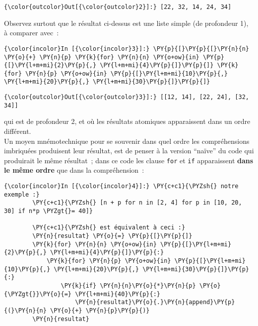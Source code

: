 \begin{Verbatim}[commandchars=\\\{\}]
{\color{outcolor}Out[{\color{outcolor}2}]:} [22, 32, 14, 24, 34]
\end{Verbatim}
            
    Observez surtout que le résultat ci-dessus est une liste simple (de
profondeur 1), à comparer avec~:

    \begin{Verbatim}[commandchars=\\\{\}]
{\color{incolor}In [{\color{incolor}3}]:} \PY{p}{[}\PY{p}{[}\PY{n}{n} \PY{o}{+} \PY{n}{p} \PY{k}{for} \PY{n}{n} \PY{o+ow}{in} \PY{p}{[}\PY{l+m+mi}{2}\PY{p}{,} \PY{l+m+mi}{4}\PY{p}{]}\PY{p}{]} \PY{k}{for} \PY{n}{p} \PY{o+ow}{in} \PY{p}{[}\PY{l+m+mi}{10}\PY{p}{,} \PY{l+m+mi}{20}\PY{p}{,} \PY{l+m+mi}{30}\PY{p}{]}\PY{p}{]}
\end{Verbatim}


\begin{Verbatim}[commandchars=\\\{\}]
{\color{outcolor}Out[{\color{outcolor}3}]:} [[12, 14], [22, 24], [32, 34]]
\end{Verbatim}
            
    qui est de profondeur 2, et où les résultats atomiques apparaissent dans
un ordre différent.\\

    Un moyen mnémotechnique pour se souvenir dans quel ordre les
compréhensions imbriquées produisent leur résultat, est de penser à la
version ``naïve'' du code qui produirait le même résultat~; dans ce code
les clause \texttt{for} et \texttt{if} apparaissent \textbf{dans le même
ordre} que dans la compréhension~:

    \begin{Verbatim}[commandchars=\\\{\}]
{\color{incolor}In [{\color{incolor}4}]:} \PY{c+c1}{\PYZsh{} notre exemple :}
        \PY{c+c1}{\PYZsh{} [n + p for n in [2, 4] for p in [10, 20, 30] if n*p \PYZgt{}= 40]}
        
        \PY{c+c1}{\PYZsh{} est équivalent à ceci :}
        \PY{n}{resultat} \PY{o}{=} \PY{p}{[}\PY{p}{]}
        \PY{k}{for} \PY{n}{n} \PY{o+ow}{in} \PY{p}{[}\PY{l+m+mi}{2}\PY{p}{,} \PY{l+m+mi}{4}\PY{p}{]}\PY{p}{:}
            \PY{k}{for} \PY{n}{p} \PY{o+ow}{in} \PY{p}{[}\PY{l+m+mi}{10}\PY{p}{,} \PY{l+m+mi}{20}\PY{p}{,} \PY{l+m+mi}{30}\PY{p}{]}\PY{p}{:}
                \PY{k}{if} \PY{n}{n}\PY{o}{*}\PY{n}{p} \PY{o}{\PYZgt{}}\PY{o}{=} \PY{l+m+mi}{40}\PY{p}{:}
                    \PY{n}{resultat}\PY{o}{.}\PY{n}{append}\PY{p}{(}\PY{n}{n} \PY{o}{+} \PY{n}{p}\PY{p}{)}
        \PY{n}{resultat}
\end{Verbatim}


